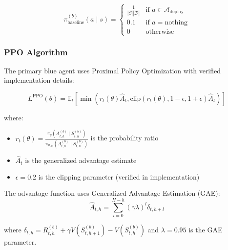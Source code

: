 \documentclass[11pt]{article}
\theoremstyle{definition}
\theoremstyle{plain}
\newcommand{\MC}[1]{\mathcal{#1}}
\newcommand{\EE}{\mathbb{E}}
\begin{document}
\begin{equation}
\pi^{(b)}_{\text{baseline}}(a \mid s) = \begin{cases}
\frac{1}{|S||\MC{D}|} & \text{if } a \in \MC{A}_{\text{deploy}} \\
0.1 & \text{if } a = \text{nothing} \\
0 & \text{otherwise}
\end{cases}
\end{equation}

\subsubsection{PPO Algorithm}

The primary blue agent uses Proximal Policy Optimization with verified implementation details:

\begin{equation}
L^{\text{PPO}}(\theta) = \EE_{t}\left[\min\left(r_t(\theta)\hat{A}_t, \text{clip}(r_t(\theta), 1-\epsilon, 1+\epsilon)\hat{A}_t\right)\right]
\end{equation}

where:
\begin{itemize}
    \item $r_t(\theta) = \frac{\pi_\theta(A_{t,h}^{(b)} \mid S_{t,h}^{(b)})}{\pi_{\theta_{\text{old}}}(A_{t,h}^{(b)} \mid S_{t,h}^{(b)})}$ is the probability ratio
    \item $\hat{A}_t$ is the generalized advantage estimate
    \item $\epsilon = 0.2$ is the clipping parameter (verified in implementation)
\end{itemize}

The advantage function uses Generalized Advantage Estimation (GAE):
\begin{equation}
\hat{A}_{t,h} = \sum_{l=0}^{H-h} (\gamma \lambda)^l \delta_{t,h+l}
\end{equation}

where $\delta_{t,h} = R_{t,h}^{(b)} + \gamma V(S_{t,h+1}^{(b)}) - V(S_{t,h}^{(b)})$ and $\lambda = 0.95$ is the GAE parameter.
\end{document}
